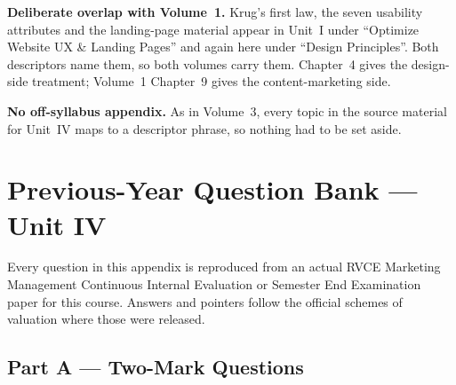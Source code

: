 \begin{keybox}
\textbf{Deliberate overlap with Volume~1.} Krug's first law, the seven usability
attributes and the landing-page material appear in Unit~I under ``Optimize
Website UX \& Landing Pages'' and again here under ``Design Principles''. Both
descriptors name them, so both volumes carry them. Chapter~4 gives the design-side
treatment; Volume~1 Chapter~9 gives the content-marketing side.

\smallskip
\textbf{No off-syllabus appendix.} As in Volume~3, every topic in the source
material for Unit~IV maps to a descriptor phrase, so nothing had to be set aside.
\end{keybox}

\chapter{Previous-Year Question Bank --- Unit IV}

Every question in this appendix is reproduced from an actual RVCE Marketing
Management Continuous Internal Evaluation or Semester End Examination paper for
this course. Answers and pointers follow the official schemes of valuation where
those were released.

\section*{Part A --- Two-Mark Questions}

